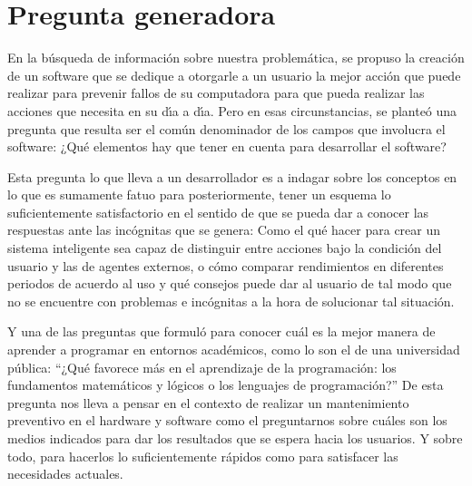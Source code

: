 \pagebreak
\section{Pregunta generadora}

En la b\'usqueda de informaci\'on sobre nuestra problem\'atica, se propuso la creaci\'on
de un software que se dedique a otorgarle a un usuario la mejor acci\'on que puede
realizar para prevenir fallos de su computadora para que pueda realizar las
acciones que necesita en su d\'{\i}a a d\'{\i}a. Pero en esas circunstancias, se plante\'o
una pregunta que resulta ser el com\'un denominador de los campos que involucra el
software: ¿Qu\'e elementos hay que tener en cuenta para desarrollar el software?

Esta pregunta lo que lleva a un desarrollador es a indagar sobre los conceptos
en lo que es sumamente fatuo para posteriormente, tener un esquema lo
suficientemente satisfactorio en el sentido de que se pueda dar a conocer las
respuestas ante las inc\'ognitas que se genera: Como el qu\'e hacer para crear un
sistema inteligente sea capaz de distinguir entre acciones bajo la condici\'on del
usuario y las de agentes externos, o c\'omo comparar rendimientos en diferentes
periodos de acuerdo al uso y qu\'e consejos puede dar al usuario de tal modo que
no se encuentre con problemas e inc\'ognitas a la hora de solucionar tal
situaci\'on.

Y una de las preguntas que formul\'o \textcite{Trejos2023} para conocer cu\'al es la
mejor manera de aprender a programar en entornos acad\'emicos, como lo son el de
una universidad p\'ublica: ``¿Qu\'e favorece m\'as en el aprendizaje de la
programaci\'on: los fundamentos matem\'aticos y l\'ogicos o los lenguajes de
programaci\'on?'' De esta pregunta nos lleva a pensar en el contexto de realizar
un mantenimiento preventivo en el hardware y software como el preguntarnos sobre
cu\'ales son los medios indicados para dar los resultados que se espera hacia los
usuarios. Y sobre todo, para hacerlos lo suficientemente r\'apidos como para
satisfacer las necesidades actuales.
